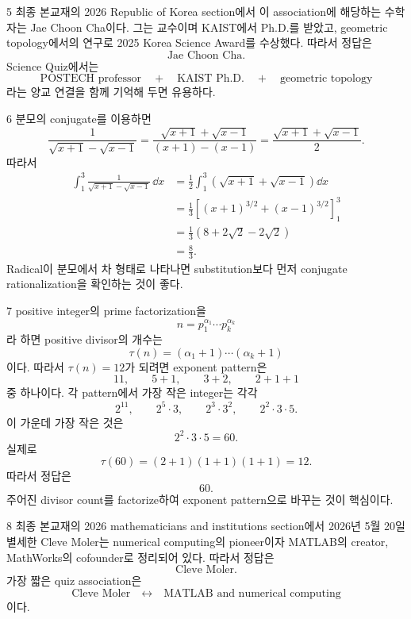 \documentclass[11pt,oneside]{article}
\begin{document}
\begin{problemsolution}{5}
최종 본교재의 2026 Republic of Korea section에서 이 association에 해당하는 수학자는 Jae Choon Cha이다. 그는 \POSTECHKorean{} 교수이며 KAIST에서 Ph.D.를 받았고, geometric topology에서의 연구로 2025 Korea Science Award를 수상했다. 따라서 정답은
\[
    \boxed{\text{Jae Choon Cha}}.
\]
Science Quiz에서는
\[
    \text{POSTECH professor}
    \quad+\quad
    \text{KAIST Ph.D.}
    \quad+\quad
    \text{geometric topology}
\]
라는 양교 연결을 함께 기억해 두면 유용하다.
\end{problemsolution}

\begin{problemsolution}{6}
분모의 conjugate를 이용하면
\[
    \frac{1}{\sqrt{x+1}-\sqrt{x-1}}
    =\frac{\sqrt{x+1}+\sqrt{x-1}}{(x+1)-(x-1)}
    =\frac{\sqrt{x+1}+\sqrt{x-1}}{2}.
\]
따라서
\[
    \begin{aligned}
    \int_1^3
    \frac{1}{\sqrt{x+1}-\sqrt{x-1}}\,\dd x
    &=%
    \frac12\int_1^3
    \left(\sqrt{x+1}+\sqrt{x-1}\right)\dd x\\
    &=\frac13
    \left[(x+1)^{3/2}+(x-1)^{3/2}\right]_1^3\\
    &=\frac13\left(8+2\sqrt2-2\sqrt2\right)\\
    &=\boxed{\frac83}.
    \end{aligned}
\]
Radical이 분모에서 차 형태로 나타나면 substitution보다 먼저 conjugate rationalization을 확인하는 것이 좋다.
\end{problemsolution}


\begin{problemsolution}{7}
positive integer의 prime factorization을
\[
    n=p_1^{\alpha_1}\cdots p_k^{\alpha_k}
\]
라 하면 positive divisor의 개수는
\[
    \tau(n)=(\alpha_1+1)\cdots(\alpha_k+1)
\]
이다. 따라서 $\tau(n)=12$가 되려면 exponent pattern은
\[
    11,
    \qquad
    5+1,
    \qquad
    3+2,
    \qquad
    2+1+1
\]
중 하나이다. 각 pattern에서 가장 작은 integer는 각각
\[
    2^{11},
    \qquad
    2^5\cdot3,
    \qquad
    2^3\cdot3^2,
    \qquad
    2^2\cdot3\cdot5.
\]
이 가운데 가장 작은 것은
\[
    2^2\cdot3\cdot5=60.
\]
실제로
\[
    \tau(60)=(2+1)(1+1)(1+1)=12.
\]
따라서 정답은
\[
    \boxed{60}.
\]
주어진 divisor count를 factorize하여 exponent pattern으로 바꾸는 것이 핵심이다.
\end{problemsolution}

\begin{problemsolution}{8}
최종 본교재의 2026 mathematicians and institutions section에서 2026년 5월 20일 별세한 Cleve Moler는 numerical computing의 pioneer이자 MATLAB의 creator, MathWorks의 cofounder로 정리되어 있다. 따라서 정답은
\[
    \boxed{\text{Cleve Moler}}.
\]
가장 짧은 quiz association은
\[
    \text{Cleve Moler}
    \quad\longleftrightarrow\quad
    \text{MATLAB and numerical computing}
\]
이다.
\end{problemsolution}
\end{document}

